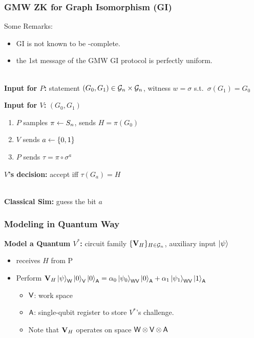 \documentclass[aspectratio=1610, 12pt, xcolor={dvipsnames}]{beamer}
\begin{document}
\begin{frame}
        \frametitle{GMW ZK for Graph Isomorphism (GI)}

Some Remarks:
\begin{itemize}
\item
GI is not known to be \NP-complete.
\item
the 1st message of the GMW GI protocol is perfectly uniform.
\end{itemize}
~\\

{\bf Input for $P$:} statement $(G_0, G_1) \in \mathcal{G}_n \times\mathcal{G}_n$, witness $w = \sigma$ s.t.\ $\sigma(G_1) = G_0$

{\bf Input for $V$:}  $(G_0, G_1)$
\begin{enumerate}
\item 
$P$ samples $\pi \leftarrow S_n$, sends $H = \pi(G_0)$
\item
$V$ sends $a \leftarrow \{0,1\}$
\item
$P$ sends $\tau = \pi \circ \sigma^a$
\end{enumerate}
{\bf $V$'s decision:} accept iff $\tau(G_a) = H$
\\~

{\bf Classical Sim:} guess the bit $a$

\end{frame}



\begin{frame}
        \frametitle{Modeling in Quantum Way}


{\bf Model a Quantum $V^*$:} circuit family $\{\vb{V}_H\}_{ H \in \mathcal{G}_n}$, auxiliary input $\ket{\psi}$
\begin{itemize}
	\item receives $H$ from P
	\item
	Perform $\vb{V}_H \ket{\psi}_\reg{w} \ket{0}_\reg{v} \ket{0}_\reg{a} = \alpha_0 \ket{\psi_0}_\reg{wv} \ket{0}_\reg{a} + \alpha_1 \ket{\psi_1}_\reg{wv} \ket{1}_\reg{a}$ 
	\begin{itemize}
	\item $\reg{v}$: work space
	\item $\reg{a}$: single-qubit register to store $V^*$'s challenge.
	\item Note that $\vb{V}_H$ operates on space $\reg{w}\tensor \reg{v} \tensor \reg{a}$
	\end{itemize}
	
\end{itemize}
\end{frame}
\end{document}
